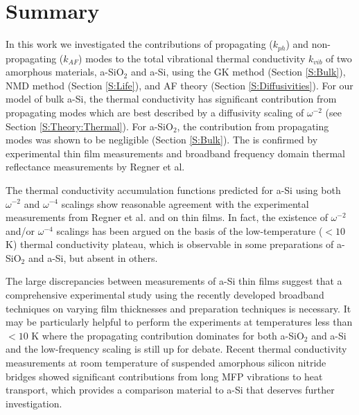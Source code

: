 \documentclass[aps,prb,twocolumn,superscriptaddress,footinbib,amsmath,amssymb,floatfix]{revtex4}
\begin{document}
\section{\label{S:Lifetimes}Summary}

In this work we investigated the contributions of propagating ($k_{ph}$) 
and non-propagating ($k_{AF}$) modes to the total vibrational 
thermal conductivity $k_{vib}$ of two amorphous materials, 
a-SiO$_2$ and a-Si, using the GK method (Section \ref{S:Bulk}), 
NMD method (Section \ref{S:Life}),  
and AF theory (Section \ref{S:Diffusivities}). 
For our model of bulk a-Si, 
the thermal conductivity has  
significant contribution from propagating modes which are best 
described by a diffusivity scaling of $\omega^{-2}$ 
(see Section \ref{S:Theory:Thermal}).  
For a-SiO$_2$, the contribution from propagating modes was shown to 
be negligible (Section \ref{S:Bulk}). 
The is confirmed by experimental thin film measurements
\cite{love_estimate_1990,baldi_thermal_2008} 
and broadband frequency domain thermal reflectance measurements  
by Regner et al.\cite{regner_broadband_2013} 

The thermal conductivity accumulation functions predicted for a-Si 
using both $\omega^{-2}$ 
and $\omega^{-4}$ scalings show reasonable agreement 
with the experimental measurements from Regner et al.
\cite{regner_broadband_2013} and on thin films.
\cite{feldman_thermal_1993,cahill_thermal_1994,
feldman_numerical_1999,liu_high_2009,yang_anomalously_2010} 
In fact, the existence of $\omega^{-2}$ and/or $\omega^{-4}$ 
scalings has been argued on the basis of the low-temperature 
($< 10$ K)
thermal conductivity plateau,
\cite{freeman_thermal_1986,feldman_thermal_1993,
feldman_numerical_1999} 
which is observable in some preparations of a-SiO$_2$
\cite{zeller_thermal_1971,freeman_thermal_1986,
cahill_lattice_1988,cahill_heat_1989} 
and a-Si\cite{pompe_thermal_1988,liu_high_2009}, 
but absent in others.
\cite{zink_excess_2006,zink_thermal_2006,liu_high_2009} 

The large discrepancies between measurements of 
a-Si thin films suggest that a comprehensive 
experimental study using the recently developed broadband 
techniques\cite{koh_frequency_2007,
minnich_thermal_2011,regner_broadband_2013} on varying film 
thicknesses and preparation techniques is necessary.  
It may be particularly helpful to perform the experiments 
at temperatures less than $< 10$ K where the propagating contribution 
dominates for both a-SiO$_2$ and a-Si and the low-frequency scaling 
is still up for debate.\cite{freeman_thermal_1986,
cahill_lattice_1988,cahill_thermal_1989,
love_estimate_1990,feldman_thermal_1993,cahill_thermal_1994,
feldman_numerical_1999,baldi_thermal_2008,liu_high_2009,
yang_anomalously_2010} 
Recent thermal conductivity measurements at room temperature 
of suspended amorphous silicon nitride bridges showed significant 
contributions from long MFP 
vibrations to heat transport,\cite{sultan_heat_2013} 
which provides a comparison material to a-Si that deserves further 
investigation. 
\end{document}
